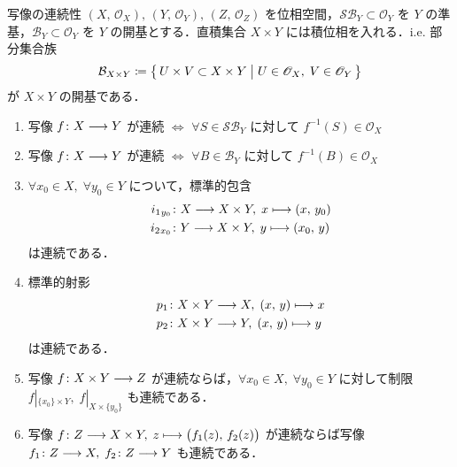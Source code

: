 \documentclass[algtopo_main]{subfiles}
\begin{document}
\begin{mylem}[label=lem:continuous, breakable]{写像の連続性}
    $(X,\, \mathscr{O}_X),\, (Y,\, \mathscr{O}_Y),\, (Z,\, \mathscr{O}_Z)$ を位相空間，$\mathcal{SB}_Y \subset \mathscr{O}_Y$ を $Y$ の準基，$\mathcal{B}_Y \subset \mathscr{O}_Y$ を $Y$ の開基とする．直積集合 $X \times Y$ には積位相を入れる．i.e. 部分集合族
    \begin{align}
        \mathcal{B}_{X \times Y} \coloneqq \bigl\{\, U \times V \subset X \times Y \bigm| U \in \mathscr{O}_X,\; V \in \mathscr{O}_Y \,\bigr\} 
    \end{align}
    が $X \times Y$ の開基である．
    \begin{enumerate}
        \item 写像 $f \colon X \longrightarrow Y$ が連続 $\iff$ $\forall S \in \mathcal{SB}_Y$ に対して $f^{-1}(S) \in \mathscr{O}_X$
        \item 写像 $f \colon X \longrightarrow Y$ が連続 $\iff$ $\forall B \in \mathcal{B}_Y$ に対して $f^{-1}(B) \in \mathscr{O}_X$
        \item $\forall x_0 \in X,\; \forall y_0 \in Y$ について，標準的包含
        \begin{align}
            i_1{}_{y_0} &\colon X \longrightarrow X \times Y,\; x \longmapsto (x,\, y_0) \\
            i_2{}_{x_0} &\colon Y \longrightarrow X \times Y,\; y \longmapsto (x_0,\, y)
        \end{align}
        は連続である．
        \item 標準的射影
        \begin{align}
            p_1 &\colon X \times Y \longrightarrow X,\; (x,\, y) \longmapsto x \\
            p_2 &\colon X \times Y \longrightarrow Y,\; (x,\, y) \longmapsto y \\
        \end{align}
        は連続である．
        \item 写像 $f \colon X \times Y \longrightarrow Z$ が連続ならば，$\forall x_0 \in X,\; \forall y_0 \in Y$ に対して制限 $f|_{\{x_0\} \times Y},\; f|_{X \times \{y_0\}}$ も連続である．
        \item 写像 $f \colon Z \longrightarrow X \times Y,\; z \longmapsto \bigl( f_1(z),\, f_2(z) \bigr)$ が連続ならば写像 $f_1 \colon Z \longrightarrow X,\; f_2 \colon Z \longrightarrow Y$ も連続である．
    \end{enumerate}
\end{mylem}
\end{document}
